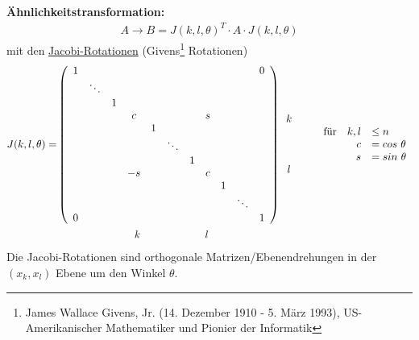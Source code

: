 \documentclass[%
a4paper,
11pt,		%
]
{scrartcl}
\theoremstyle{plain}
\theoremstyle{plain}
\theoremstyle{plain}
\theoremstyle{plain}
\begin{document}
\textbf{Ähnlichkeitstransformation:}
\begin{align*}
A \rightarrow B = J(k,l,\theta)^T \cdot A \cdot J(k,l,\theta)
\end{align*}
mit den \uline{Jacobi-Rotationen} (Givens\footnote{James Wallace Givens, Jr. (14. Dezember 1910 - 5. März 1993), US-Amerikanischer Mathematiker und Pionier der Informatik} Rotationen)
\begin{align*}
J(k,l,\theta) = & 
\left(
\begin{array}{ccccccccccc}
1   &       &       &       &       &       &       &       &       &       & 0\\
    &\ddots \\
    &       & 1\\
    &       &       & c     &       &       &       & s\\
    &       &       &       & 1\\
    &       &       &       &       &\ddots\\
    &       &       &       &       &       & 1\\
    &       &       & -s    &       &       &       & c\\
    &       &       &       &       &       &       &       & 1\\
    &       &       &       &       &       &       &       &       &\ddots\\
0   &       &       &       &       &       &       &       &       &       & 1\\
\end{array}
\right)
\begin{array}{c}
 \\ \\ \\ k\\ \\ \\ \\ l\\ \\ \\ \\
\end{array}
\qquad
\begin{array}{crl}
\text{für} & k,l & \leq n\\
 & c & = cos\ \theta\\
 & s & = sin\ \theta
\end{array}\\
&
\hspace*{4ex}
\begin{array}{ccccccccccc}
  \phantom{0} & \phantom{\dots} & \phantom{1} & k & \phantom{1} & \phantom{\dots} & \phantom{1} & l
\end{array}
\end{align*}
Die Jacobi-Rotationen sind orthogonale Matrizen/Ebenendrehungen in der $(x_k,x_l)$ Ebene um den Winkel $\theta$.
\end{document}
